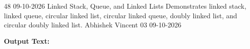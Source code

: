 \clearpage
\label{prog:48}
\programhead
  {48}
  {09-10-2026}
  {Linked Stack, Queue, and Linked Lists}
  {Demonstrates linked stack, linked queue, circular linked list, circular linked queue, doubly linked list, and circular doubly linked list.}
  {Abhishek Vincent}
  {03}
  {09-10-2026}

\divider
\textbf{Output Text:}\par
\vspace{2pt}

